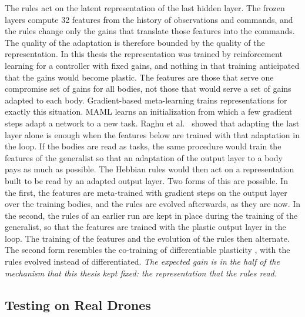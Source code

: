 The rules act on the latent representation of the last hidden layer. The frozen layers compute 32 features from the history of observations and commands, and the rules change only the gains that translate those features into the commands. The quality of the adaptation is therefore bounded by the quality of the representation. In this thesis the representation was trained by reinforcement learning for a controller with fixed gains, and nothing in that training anticipated that the gains would become plastic. The features are those that serve one compromise set of gains for all bodies, not those that would serve a set of gains adapted to each body. Gradient-based meta-learning trains representations for exactly this situation. MAML \cite{finn2017maml} learns an initialization from which a few gradient steps adapt a network to a new task. Raghu et al.\ \cite{raghu2020rapid} showed that adapting the last layer alone is enough when the features below are trained with that adaptation in the loop. If the bodies are read as tasks, the same procedure would train the features of the generalist so that an adaptation of the output layer to a body pays as much as possible. The Hebbian rules would then act on a representation built to be read by an adapted output layer. Two forms of this are possible. In the first, the features are meta-trained with gradient steps on the output layer over the training bodies, and the rules are evolved afterwards, as they are now. In the second, the rules of an earlier run are kept in place during the training of the generalist, so that the features are trained with the plastic output layer in the loop. The training of the features and the evolution of the rules then alternate. The second form resembles the co-training of differentiable plasticity \cite{miconi2018differentiable}, with the rules evolved instead of differentiated. \emph{The expected gain is in the half of the mechanism that this thesis kept fixed: the representation that the rules read.}

\subsection{Testing on Real Drones}
\label{subsec:future-real-drones}

